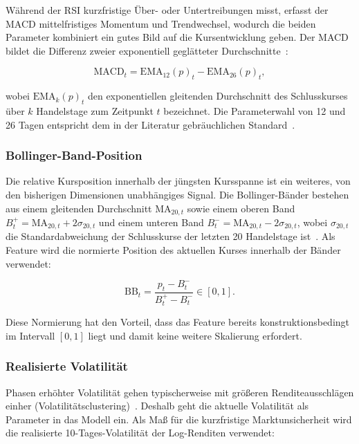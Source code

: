 Während der RSI kurzfristige Über- oder Untertreibungen misst, erfasst der \ac{MACD} mittelfristiges Momentum und Trendwechsel, wodurch die beiden Parameter kombiniert ein gutes Bild auf die Kursentwicklung geben. Der \ac{MACD} bildet die Differenz zweier exponentiell geglätteter Durchschnitte~\cite{appel1979}:

\begin{equation}
    \text{MACD}_t = \text{EMA}_{12}(p)_t - \text{EMA}_{26}(p)_t,
\end{equation}

wobei $\text{EMA}_{k}(p)_t$ den exponentiellen gleitenden Durchschnitt des Schlusskurses über $k$ Handelstage zum Zeitpunkt $t$ bezeichnet. Die Parameterwahl von 12 und 26 Tagen entspricht dem in der Literatur gebräuchlichen Standard~\cite{appel1979}.

\subsubsection{Bollinger-Band-Position}

Die relative Kursposition innerhalb der jüngsten Kursspanne ist ein weiteres, von den bisherigen Dimensionen unabhängiges Signal. Die Bollinger-Bänder bestehen aus einem gleitenden Durchschnitt $\text{MA}_{20,t}$ sowie einem oberen Band $B^+_t = \text{MA}_{20,t} + 2\sigma_{20,t}$ und einem unteren Band $B^-_t = \text{MA}_{20,t} - 2\sigma_{20,t}$, wobei $\sigma_{20,t}$ die Standardabweichung der Schlusskurse der letzten 20 Handelstage ist~\cite{bollinger2001}. Als Feature wird die normierte Position des aktuellen Kurses innerhalb der Bänder verwendet:

\begin{equation}
    \text{BB}_t = \frac{p_t - B^-_t}{B^+_t - B^-_t} \in [0, 1].
\end{equation}

Diese Normierung hat den Vorteil, dass das Feature bereits konstruktionsbedingt im Intervall $[0,1]$ liegt und damit keine weitere Skalierung erfordert.

\subsubsection{Realisierte Volatilität}

Phasen erhöhter Volatilität gehen typischerweise mit größeren Renditeausschlägen einher (Volatilitätsclustering)~\cite{engle1982}. Deshalb geht die aktuelle Volatilität als Parameter in das Modell ein. Als Maß für die kurzfristige Marktunsicherheit wird die realisierte 10-Tages-Volatilität der Log-Renditen verwendet:


